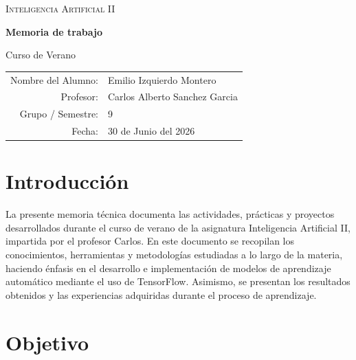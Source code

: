 \documentclass[12pt]{article}
\begin{document}
\begin{titlepage}
    \centering


    {\scshape\Large Inteligencia Artificial II \par}
    \vspace{1.5cm}

    {\huge\bfseries Memoria de trabajo \par}
    \vspace{0.5cm}
    {\Large Curso de Verano \par}

    \vfill

    {\large
    \begin{tabular}{rl}
        Nombre del Alumno: & Emilio Izquierdo Montero \\
        Profesor:          & Carlos Alberto Sanchez Garcia \\
        Grupo / Semestre:  & 9 \\
        Fecha:             & 30 de Junio del 2026 \\
    \end{tabular}
    \par}

    \vfill

\end{titlepage}

\tableofcontents
\newpage

\section{Introducción}

La presente memoria técnica documenta las actividades, prácticas y proyectos desarrollados durante el curso de verano de la asignatura 
Inteligencia Artificial II, impartida por el profesor Carlos.
En este documento se recopilan los conocimientos, herramientas y metodologías estudiadas a lo largo de la materia, 
haciendo énfasis en el desarrollo e implementación de modelos de aprendizaje automático mediante el uso de TensorFlow.
Asimismo, se presentan los resultados obtenidos y las experiencias adquiridas durante el proceso de aprendizaje.

\newpage

\section{Objetivo}
\end{document}
